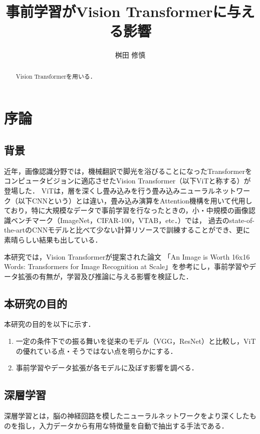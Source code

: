 \documentclass[a4paper, oneside, openany, dvipdfmx]{suribt}%
\title{事前学習がVision Transformerに与える影響}
\author{桝田 修慎}
\begin{document}
\maketitle%

\frontmatter%
\begin{abstract}%
  Vision Transformerを用いる．
\end{abstract}

\setcounter{tocdepth}{2}
\tableofcontents%

\mainmatter%
\chapter{序論}
\section{背景}
近年，画像認識分野では，機械翻訳で脚光を浴びることになったTransformer\cite{vaswani2017attention}をコンピュータビジョンに適応させたVision Transformer（以下ViTと称する）が登場した\cite{dosovitskiy2021image}．
ViTは，層を深くし畳み込みを行う畳み込みニューラルネットワーク（以下CNNという）とは違い，畳み込み演算をAttention機構を用いて代用しており，特に大規模なデータで事前学習を行なったときの，小・中規模の画像認識ベンチマーク（ImageNet，CIFAR-100，VTAB，etc．）では，
過去のstate-of-the-artのCNNモデルと比べて少ない計算リソースで訓練することができ、更に素晴らしい結果も出している．

本研究では，Vision Transformerが提案された論文
「An Image is Worth 16x16 Words: Transformers for Image Recognition at Scale」を参考にし，事前学習やデータ拡張の有無が，学習及び推論に与える影響を検証した．
\section{本研究の目的}
本研究の目的を以下に示す．
\begin{enumerate}
  \item 一定の条件下での振る舞いを従来のモデル（VGG，ResNet）と比較し，ViTの優れている点・そうではない点を明らかにする．
  \item 事前学習やデータ拡張が各モデルに及ぼす影響を調べる．
\end{enumerate}

\section{深層学習}
深層学習とは，脳の神経回路を模したニューラルネットワークをより深くしたものを指し，入力データから有用な特徴量を自動で抽出する手法である．
\end{document}
